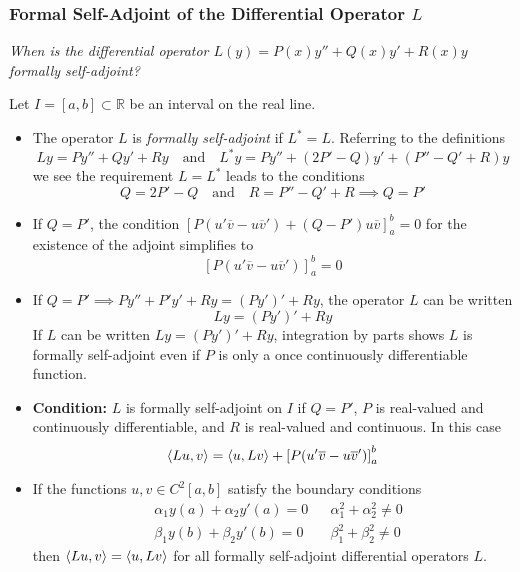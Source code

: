 \documentclass[11pt, a4paper]{article}
\newcommand{\question}[1]{\textit{#1}\vspace{2mm}}
\newcommand{\R}{\mathbb{R}} %
\begin{document}
\subsubsection{Formal Self-Adjoint of the Differential Operator $ L $}
\question{When is the differential operator $ L(y) = P(x)y'' + Q(x) y' + R(x) y $ formally self-adjoint?}

Let $ I = [a, b] \subset \R $ be an interval on the real line.
\begin{itemize}
	\item The operator $ L $ is \textit{formally self-adjoint} if $ L^* = L $. Referring to the definitions
	\begin{equation*}
		Ly = Py'' + Q y' + Ry \quad \text{and} \quad L^* y = Py'' + (2P' - Q)y' + (P'' - Q' + R)y
	\end{equation*} 
	we see the requirement $ L = L^{*} $ leads to the conditions
	\begin{equation*}
		Q = 2P' - Q \quad \text{and} \quad R = P'' - Q' + R \implies Q = P'
	\end{equation*}
	
	\item If $ Q = P' $, the condition $ \left[P(u'\overline{v} - u \overline{v}') + (Q - P')u\overline{v}\right]_{a}^{b} = 0 $ for the existence of the adjoint simplifies to
	\begin{equation*}
		\left[P(u'\overline{v} - u \overline{v}') \right]_{a}^{b} = 0
	\end{equation*}
	
	\item If $ Q = P' \implies Py'' + P' y' + Ry = (Py')' + Ry$, the operator $ L $ can be written
	\begin{equation*}
		Ly = (Py')' + Ry
	\end{equation*}
	If $ L $ can be written $ Ly = (Py')' + Ry $, integration by parts shows $ L $ is formally self-adjoint even if $ P $ is only a once continuously differentiable function.
	
	\item \textbf{Condition:} $ L $ is formally self-adjoint on $ I $ if $ Q = P' $, $ P $ is real-valued and continuously differentiable, and $ R $ is real-valued and continuous. In this case
	\begin{equation*}
		\expval{Lu, v} = \expval{u, Lv} + \left[P(u'\overline{v} - u \overline{v}') \right]_{a}^{b}
	\end{equation*}
	
	\item If the functions $ u, v \in C^2[a, b] $ satisfy the boundary conditions
	\begin{align*}
		&\alpha_{1} y(a) + \alpha_{2} y'(a) = 0 && \alpha_{1}^{2} + \alpha_{2}^{2} \neq 0\\
		&\beta_{1} y(b) + \beta_{2} y'(b) = 0 && \beta_{1}^{2} + \beta_{2}^{2} \neq 0
	\end{align*}
	then $ \expval{Lu, v} = \expval{u, Lv} $ for all formally self-adjoint differential operators $ L $.
	

\end{itemize}
\end{document}
